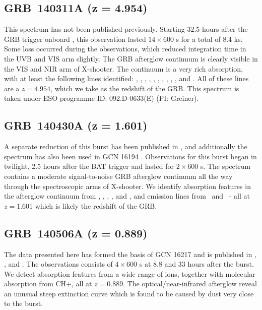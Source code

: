 \documentclass{aa}    %
\begin{document}
\subsection{GRB~140311A (z = 4.954)}	
\label{140311}

This spectrum has not been published previously. Starting 32.5 hours after the
GRB trigger onboard \swift, this observation lasted $14\times600$ s for a total
of 8.4 ks. Some loss occurred during the observations, which reduced integration
time in the UVB and VIS arm slightly. The GRB afterglow continuum is clearly
visible in the VIS and NIR arm of X-shooter. The continuum is a very rich
absorption, with at least the following lines identified: \lyg, \lyb, \lya,
\SIii, \SIiv, \civ, \alii, \aliii, \feii, \mgii, and \mgi. All of these lines
are a $z = 4.954$, which we take as the redshift of the GRB. This spectrum is
taken under ESO programme ID: 092.D-0633(E) (PI: Greiner).

\subsection{GRB~140430A (z = 1.601)}\label{140430}

A separate reduction of this burst has been published in \citet{Kruhler2015},
and additionally the spectrum has also been used in GCN 16194 \citep{GCN16194}.
Observations for this burst began in twilight, 2.5 hours after the BAT trigger
and lasted for $2\times600$ s. The spectrum contains a moderate signal-to-noise
GRB afterglow continuum all the way through the spectroscopic arms of X-shooter.
We identify absorption features in the afterglow continuum from \SIii, \civ,
\alii, \feii, and \mgii, and emission lines from \oii~and \oiii~- all at $z =
1.601$ which is likely the redshift of the GRB.

\subsection{GRB~140506A  (z = 0.889)} \label{140506}

The data presented here has formed the basis of GCN 16217 \citep{GCN16217} and
is published in \citet{Fynbo2014}, \citet{Kruhler2015}, and \citet{Heintz2017a}.
The observations consists of $4\times 600$ s at 8.8 and 33 hours after the
burst. We detect absorption features from a wide range of ions, together with
molecular absorption from CH+, all at $z=0.889$. The optical/near-infrared
afterglow reveal an unusual steep extinction curve which is found to be caused
by dust very close to the burst.
\end{document}
